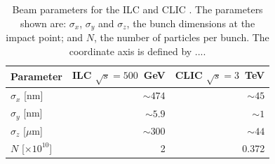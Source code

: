 \begin{table}[h!]
\centering
\begin{tabular}{ l r r }
\hline
Parameter & ILC $\sqrt{s} = 500$~GeV & CLIC $\sqrt{s} = 3$~TeV \\
\hline
$\sigma_{x}$ [nm] & $\sim 474$ & $\sim 45$ \\
$\sigma_{y}$ [nm] & $\sim 5.9$ & $\sim 1$ \\
$\sigma_{z}$ [$\mu$m]& $\sim 300$ & $\sim 44$ \\
$N$ [$\times 10^{10}$] & 2 & 0.372 \\
\hline
\end{tabular}
\caption[Beam parameters for the ILC \cite{Behnke:2013xla} and CLIC \cite{Linssen:2012hp}.  The parameters shown are: $\sigma_{x}$, $\sigma_{y}$ and $\sigma_{z}$, the bunch dimensions at the impact point; and $N$, the number of particles per bunch.  The coordinate axis is defined by ....]{{Beam parameters for the ILC \cite{Behnke:2013xla} and CLIC \cite{Linssen:2012hp}.  The parameters shown are: $\sigma_{x}$, $\sigma_{y}$ and $\sigma_{z}$, the bunch dimensions at the impact point; and $N$, the number of particles per bunch.  The coordinate axis is defined by ....}}
\label{table:clicbeam}
\end{table}


